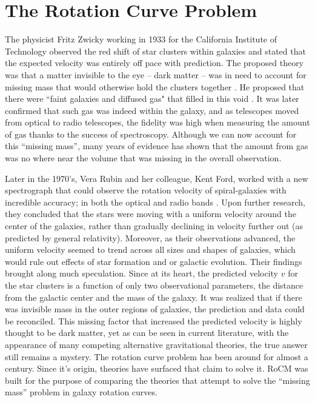 \documentclass[conference]{IEEEtran-modified}
\begin{document}
\section{The Rotation Curve Problem}

The physicist Fritz Zwicky working in 1933 for the California Institute of Technology observed the red shift of star clusters within galaxies and stated that the expected velocity was entirely off pace with prediction. The proposed theory was that a matter invisible to the eye -- dark matter -- was in need to account for missing mass that would otherwise hold the clusters together \cite{zwicky}. He proposed that there were ``faint galaxies and diffused gas" that filled in this void \cite{zwicky}. It was later confirmed that such gas was indeed within the galaxy, and as telescopes moved from optical to radio telescopes, the fidelity was high when measuring the amount of gas thanks to the success of spectroscopy.  Although we can now account for this ``missing mass'', many years of evidence has shown that the amount from gas was no where near the volume that was missing in the overall observation. 

Later in the 1970's, Vera Rubin and her colleague, Kent Ford, worked with a new spectrograph that could observe the rotation velocity of spiral-galaxies with incredible accuracy; in both the optical and radio bands \cite{rubin1980}. Upon further research, they concluded that the stars were moving with a uniform velocity around the center of the galaxies, rather than gradually declining in velocity further out (as predicted by general relativity).  Moreover, as their observations advanced, the uniform velocity seemed to trend across all sizes and shapes of galaxies, which would rule out effects of star formation and or galactic evolution. Their findings brought along much speculation.  Since at its heart, the predicted velocity $v$ for the star clusters is a function of only two observational parameters, the distance from the galactic center and the mass of the galaxy. It was realized that if there was invisible mass in the outer regions of galaxies, the prediction and data could be reconciled. This missing factor that increased the predicted velocity is highly thought to be dark matter, yet as can be seen in current literature, with the appearance of many competing alternative gravitational theories, the true answer still remains a mystery.
The rotation curve problem has been around for almost a century. Since it's origin, theories have surfaced that claim to solve it. RoCM was built for the purpose of comparing the theories that attempt to solve the ``missing mass'' problem in galaxy rotation curves.
\end{document}
